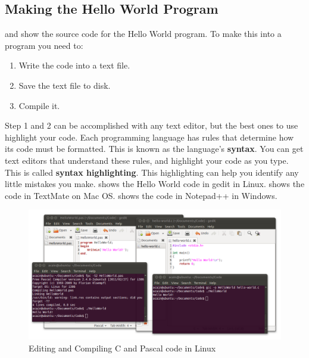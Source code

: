 \clearpage
\subsection{Making the Hello World Program} %
\label{sub:compiling_code}

 and  show the source code for the Hello World program. To make this into a program you need to:

\begin{enumerate}
  \item Write the code into a text file.
  \item Save the text file to disk.
  \item Compile it.
\end{enumerate}

Step 1 and 2 can be accomplished with any text editor, but the best ones to use highlight your code. Each programming language has rules that determine how its code must be formatted. This is known as the language's \textbf{syntax}. You can get text editors that understand these rules, and highlight your code as you type. This is called \textbf{syntax highlighting}. This highlighting can help you identify any little mistakes you make.  shows the Hello World code in gedit in Linux.  shows the code in TextMate on Mac OS.  shows the code in Notepad++ in Windows.

\begin{figure}[h]
   \centering
   \includegraphics[width=\textwidth]{./topics/programs-and-compilers/images/LinuxEditors} 
   \caption{Editing and Compiling C and Pascal code in Linux}
   \label{fig:linux-editors}
\end{figure}

